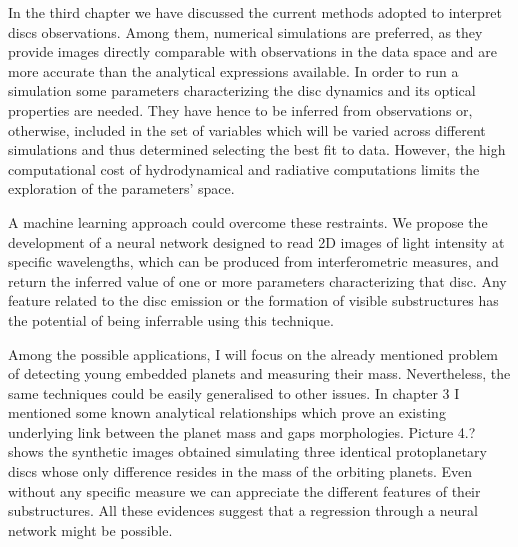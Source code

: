 \documentclass[a4paper,10pt]{report}
\begin{document}

In the third chapter we have discussed the current methods adopted to interpret discs observations.
Among them, numerical simulations are preferred, as they provide images
directly comparable with observations in the data space and are more accurate than the analytical expressions available.
In order to run a simulation some parameters characterizing the disc dynamics and its optical properties are needed.
They have hence to be inferred from observations or, otherwise, included in the set of variables which will be varied across different simulations
and thus determined selecting the best fit to data. However, the high computational cost of hydrodynamical and radiative 
computations limits the exploration of the parameters' space.

A machine learning approach could overcome these restraints. We propose the development
of a neural network designed to read 2D images of light intensity at specific wavelengths,
which can be produced from interferometric measures, and return the inferred value of one or more 
parameters characterizing that disc. Any feature related to the disc emission or the formation of visible substructures 
has the potential of being inferrable using this technique.

Among the possible applications, I will focus on the already mentioned problem of detecting young embedded planets and measuring their mass.
Nevertheless, the same techniques could be easily generalised to other issues.
In chapter 3 I mentioned some known analytical relationships which prove an existing underlying link
between the planet mass and gaps morphologies. Picture 4.? shows the synthetic images obtained simulating
three identical protoplanetary discs whose only difference resides in the mass of the orbiting planets. 
Even without any specific measure we can appreciate the different features of their substructures.
All these evidences suggest that a regression through a neural network might be possible.
\end{document}
